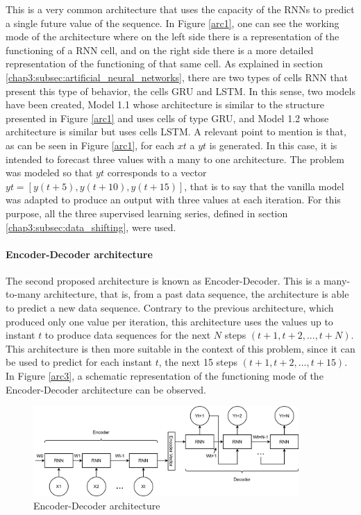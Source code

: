 This is a very common architecture that uses the capacity of the \ac{RNN}s to predict a single future value of the sequence. In Figure \ref{arc1}, one can see the working mode of the architecture where on the left side there is a representation of the functioning of a RNN cell, and on the right side there is a more detailed representation of the functioning of that same cell. As explained in section \ref{chap3:subsec:artificial_neural_networks}, there are two types of cells \ac{RNN} that present this type of behavior, the cells \ac{GRU} and \ac{LSTM}. In this sense, two models have been created, Model 1.1 whose architecture is similar to the structure presented in Figure \ref{arc1} and uses cells of type \ac{GRU}, and Model 1.2 whose architecture is similar but uses cells \ac{LSTM}. A relevant point to mention is that, as can be seen in Figure \ref{arc1}, for each $xt$ a $yt$ is generated. In this case, it is intended to forecast three values with a many to one architecture. The problem was modeled so that $yt$ corresponds to a vector $yt = [y(t+5), y(t+10), y(t+15)]$, that is to say that the vanilla model was adapted to produce an output with three values at each iteration. For this purpose, all the three supervised learning series, defined in section \ref{chap3:subsec:data_shifting}, were used.



\paragraph{Encoder-Decoder architecture}

The second proposed architecture is known as Encoder-Decoder.  This is a many-to-many architecture, that is, from a past data sequence, the architecture is able to predict a new data sequence. Contrary to the previous architecture, which produced only one value per iteration, this architecture uses the values up to instant $t$ to produce data sequences for the next $N$ steps $(t+1, t+2, ..., t+N)$. This architecture is then more suitable in the context of this problem, since it can be used to predict for each instant $t$, the next 15 steps $(t+1, t+2, ..., t+15)$. In Figure \ref{arc3}, a schematic representation of the functioning mode of the Encoder-Decoder architecture can be observed. 

\begin{figure}[h!]
    \centering
    \begin{center}
    \includegraphics[width=0.9\textwidth]{Images/arc2.png}
    \caption{Encoder-Decoder architecture}
    \label{arc2}
    \end{center}
\end{figure}

